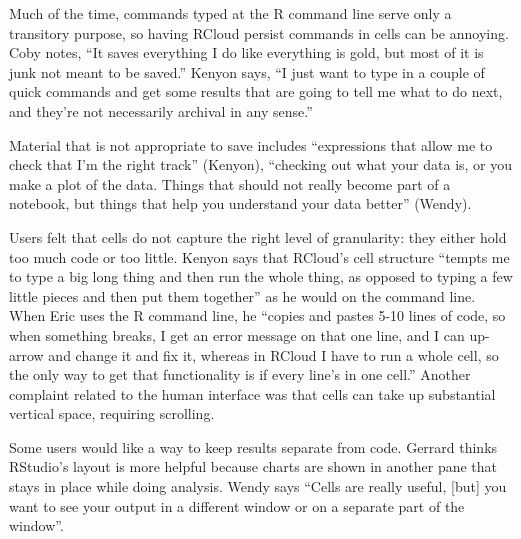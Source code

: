 
Much of the time, commands typed at the R command line serve only a transitory
purpose, so having RCloud persist commands in cells can be annoying.
Coby notes, ``It saves everything I do like everything is gold, but most
of it is junk not meant to be saved.'' Kenyon says, ``I just want to type in a
couple of quick commands and get some results that are going to tell
me what to do next, and they're not necessarily archival in any sense.''

Material that is not appropriate to save includes ``expressions that allow
me to check that I'm the right track'' (Kenyon), ``checking out what your data is,
or you make a plot of the data. Things that should not really become part of a
notebook, but things that help you understand your data better'' (Wendy).

Users felt that cells do not capture the right level of granularity: they
either hold too much code or too little. Kenyon says that RCloud's cell structure
``tempts me to type a big long thing and then run the whole thing, as opposed to
typing a few little pieces and then put them together'' as he would on the command line.
When Eric uses the R command line, he ``copies and pastes 5-10 lines of code,
so when something breaks, I get an error message on that one line, and I can
up-arrow and change it and fix it, whereas in RCloud I have to run a whole cell,
so the only way to get that functionality is if every line's in one cell.''
Another complaint related to the human interface was that cells can take up
substantial vertical space, requiring scrolling.

Some users would like a way to keep results separate from code.
Gerrard thinks RStudio's layout is more helpful because charts
are shown in another pane that stays in place while doing analysis. Wendy says
``Cells are really useful, [but] you want to see your output in a different
window or on a separate part of the window''.

